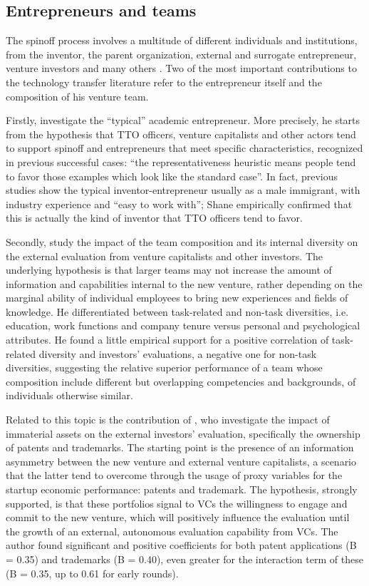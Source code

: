 \subsection{Entrepreneurs and teams}

The spinoff process involves a multitude of different individuals and institutions, from the inventor, the parent organization, external and surrogate entrepreneur, venture investors and many others \citep{Djokovic2008}. Two of the most important contributions to the technology transfer literature refer to the entrepreneur itself and the composition of his venture team.

Firstly, \citet{Shane2015} investigate the \enquote{typical} academic entrepreneur. More precisely, he starts from the hypothesis that TTO officers, venture capitalists and other actors tend to support spinoff and entrepreneurs that meet specific characteristics, recognized in previous successful cases: \enquote{the representativeness heuristic means people tend to favor those examples which look like the standard case}. In fact, previous studies show the typical inventor-entrepreneur usually as a male immigrant, with industry experience and \enquote{easy to work with}; Shane empirically confirmed that this is actually the kind of inventor that TTO officers tend to favor.

Secondly, \citet{DerFoo2005} study the impact of the team composition and its internal diversity on the external evaluation from venture capitalists and other investors. The underlying hypothesis is that larger teams may not increase the amount of information and capabilities internal to the new venture, rather depending on the marginal ability of individual employees to bring new experiences and fields of knowledge. He differentiated between task-related and non-task diversities, i.e. education, work functions and company tenure versus personal and psychological attributes. He found a little empirical support for a positive correlation of task-related diversity and investors' evaluations, a negative one for non-task diversities, suggesting the relative superior performance of a team whose composition include different but overlapping competencies and backgrounds, of individuals otherwise similar.

Related to this topic is the contribution of \citet{Zhou2014}, who investigate the impact of immaterial assets on the external investors' evaluation, specifically the ownership of patents and trademarks. The starting point is the presence of an information asymmetry between the new venture and external venture capitalists, a scenario that the latter tend to overcome through the usage of proxy variables for the startup economic performance: patents and trademark. The hypothesis, strongly supported, is that these portfolios signal to VCs the willingness to engage and commit to the new venture, which will positively influence the evaluation until the growth of an external, autonomous evaluation capability from VCs. The author found significant and positive coefficients for both patent applications (B = 0.35) and trademarks (B = 0.40), even greater for the interaction term of these (B = 0.35, up to 0.61 for early rounds).

